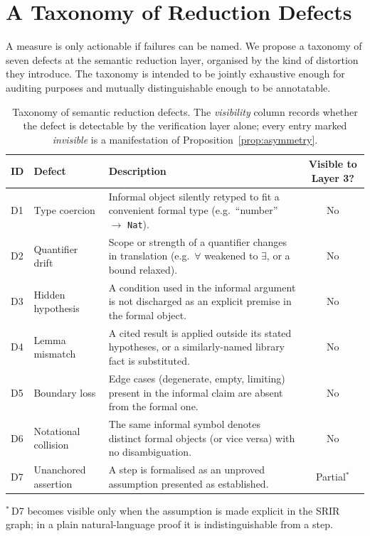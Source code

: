 \documentclass[11pt,a4paper]{article}
\theoremstyle{definition}
\theoremstyle{plain}
\theoremstyle{remark}
\begin{document}
\section{A Taxonomy of Reduction Defects}
\label{sec:taxonomy}

A measure is only actionable if failures can be named. We propose a taxonomy of
seven defects at the semantic reduction layer, organised by the kind of
distortion they introduce. The taxonomy is intended to be jointly exhaustive
enough for auditing purposes and mutually distinguishable enough to be
annotatable.

\begin{table}[t]
\centering
\small
\caption{Taxonomy of semantic reduction defects. The \emph{visibility} column
records whether the defect is detectable by the verification layer alone; every
entry marked \emph{invisible} is a manifestation of
Proposition~\ref{prop:asymmetry}.}
\label{tab:taxonomy}
\begin{tabularx}{\textwidth}{@{}l l X c@{}}
\toprule
\textbf{ID} & \textbf{Defect} & \textbf{Description} & \textbf{Visible to Layer 3?} \\
\midrule
D1 & Type coercion &
Informal object silently retyped to fit a convenient formal type (e.g.\
``number'' $\to$ \texttt{Nat}). &
No \\
D2 & Quantifier drift &
Scope or strength of a quantifier changes in translation (e.g.\ $\forall$
weakened to $\exists$, or a bound relaxed). &
No \\
D3 & Hidden hypothesis &
A condition used in the informal argument is not discharged as an explicit
premise in the formal object. &
No \\
D4 & Lemma mismatch &
A cited result is applied outside its stated hypotheses, or a similarly-named
library fact is substituted. &
No \\
D5 & Boundary loss &
Edge cases (degenerate, empty, limiting) present in the informal claim are
absent from the formal one. &
No \\
D6 & Notational collision &
The same informal symbol denotes distinct formal objects (or vice versa) with no
disambiguation. &
No \\
D7 & Unanchored assertion &
A step is formalised as an unproved assumption presented as established. &
Partial$^{\ast}$ \\
\bottomrule
\end{tabularx}

\vspace{2pt}
\raggedright\footnotesize $^{\ast}$\,D7 becomes visible only when the
assumption is made explicit in the SRIR graph; in a plain natural-language
proof it is indistinguishable from a step.
\end{table}
\end{document}
